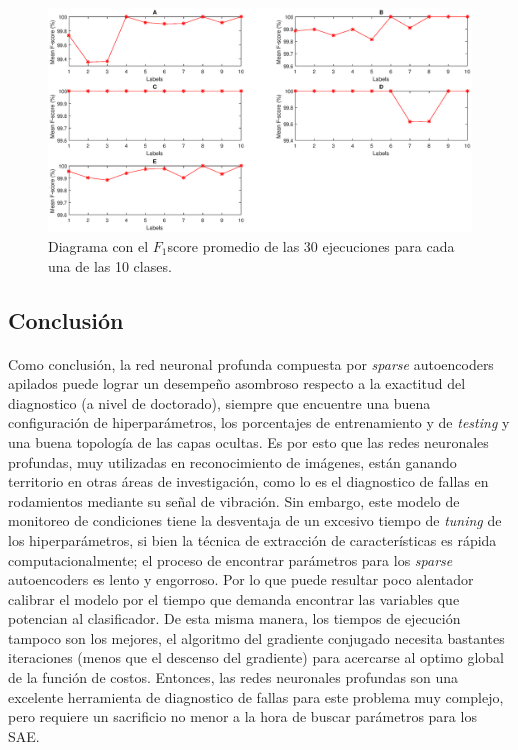 \documentclass[12pt]{article}%
\begin{document}
\begin{figure}[ht]
  \centering
    \includegraphics[scale=0.5]{./Fsc.eps}
  \caption{Diagrama con el $F_{1}$score promedio de las 30 ejecuciones para cada una de las 10 clases.}
  \label{fig:Fsc}
\end{figure}

\subsection{Conclusión}
\paragraph{}
Como conclusión, la red neuronal profunda compuesta por \textit{sparse} autoencoders apilados puede lograr un desempeño asombroso respecto a la exactitud del diagnostico (a nivel de doctorado), siempre que encuentre una buena configuración de hiperparámetros, los porcentajes de entrenamiento y de \textit{testing} y una buena topología de las capas ocultas. Es por esto que las redes neuronales profundas, muy utilizadas en reconocimiento de imágenes, están ganando territorio en otras áreas de investigación, como lo es el diagnostico de fallas en rodamientos mediante su señal de vibración. Sin embargo, este modelo de monitoreo de condiciones tiene la desventaja de un excesivo tiempo de \textit{tuning} de los hiperparámetros, si bien la técnica de extracción de características es rápida computacionalmente; el proceso de encontrar parámetros para los \textit{sparse} autoencoders es lento y engorroso. Por lo que puede resultar poco alentador calibrar el modelo por el tiempo que demanda encontrar las variables que potencian al clasificador. De esta misma manera, los tiempos de ejecución tampoco son los mejores, el algoritmo del gradiente conjugado necesita bastantes iteraciones (menos que el descenso del gradiente) para acercarse al optimo global de la función de costos. Entonces, las redes neuronales profundas son una excelente herramienta de diagnostico de fallas para este problema muy complejo, pero requiere un sacrificio no menor a la hora de buscar parámetros para los SAE.
\end{document}
